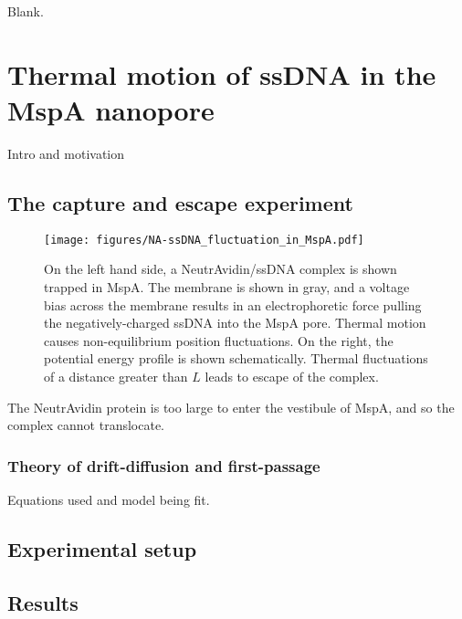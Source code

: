 \begin{savequote}[75mm]
Blank.
\end{savequote}

\chapter{Thermal motion of ssDNA in the MspA nanopore}
\label{dna_thermal_motion_mspa}

Intro and motivation

\section{The capture and escape experiment}

\begin{figure}[h]
\begin{centering}
\texttt{[image: figures/NA-ssDNA\_fluctuation\_in\_MspA.pdf]}
\caption[The idea of capture and escape]{On the left hand side, a NeutrAvidin/ssDNA complex is shown trapped in MspA.  The membrane is shown in gray, and a voltage bias across the membrane results in an electrophoretic force pulling the negatively-charged ssDNA into the MspA pore.  Thermal motion causes non-equilibrium position fluctuations.  On the right, the potential energy profile is shown schematically.  Thermal fluctuations of a distance greater than $L$ leads to escape of the complex.}
\label{fig:capture_escape_idea}
\end{centering}
\end{figure}

The NeutrAvidin protein is too large to enter the vestibule of MspA, and so the complex cannot translocate.

\subsection{Theory of drift-diffusion and first-passage}

Equations used and model being fit.

\section{Experimental setup}



\section{Results}

